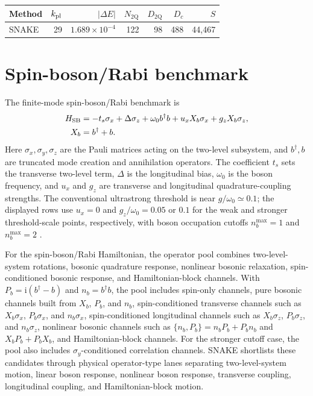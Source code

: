 \documentclass[
  reprint,
  amsmath,
  amssymb,
  aps,
  pra,
  nofootinbib,
  superscriptaddress,
  floatfix
]{revtex4-2}
\newcommand{\ii}{\mathrm{i}}
\newcommand{\twq}{\mathrm{2Q}}
\begin{document}
\begin{center}
\begin{tabular}{lrrrrrr}
\toprule
Method & \(k_{\rm pl}\) & \(|\Delta E|\) & \(N_{\twq}\) & \(D_{\twq}\) & \(D_c\) & \(S\) \\
\midrule
SNAKE & 29 & \(1.689\times10^{-4}\) & 122 & 98 & 488 & 44{,}467 \\
\bottomrule
\end{tabular}
\end{center}


\section{Spin-boson/Rabi benchmark}
\label{app:spin_boson_rabi}

The finite-mode spin-boson/Rabi benchmark is
\begin{equation*}
\begin{aligned}
H_{\rm SB}
&=-t_s\sigma_x+\Delta\sigma_z+\omega_0 b^\dagger b
+u_xX_b\sigma_x+g_zX_b\sigma_z,\\
X_b&=b^\dagger+b .
\end{aligned}
\end{equation*}
Here \(\sigma_x,\sigma_y,\sigma_z\) are the Pauli matrices acting on the
two-level subsystem, and \(b^\dagger,b\) are truncated mode creation and
annihilation operators. The coefficient \(t_s\) sets the transverse two-level
term, \(\Delta\) is the longitudinal bias, \(\omega_0\) is the boson frequency,
and \(u_x\) and \(g_z\) are transverse and longitudinal quadrature-coupling
strengths. The conventional ultrastrong threshold is near
\(g/\omega_0\simeq 0.1\); the displayed rows use \(u_x=0\) and
\(g_z/\omega_0=0.05\) or \(0.1\) for the weak and stronger threshold-scale
points, respectively, with boson occupation cutoffs \(n_b^{\max}=1\) and
\(n_b^{\max}=2\) \cite{Kockum2019Ultrastrong,FornDiaz2019Ultrastrong}.

For the spin-boson/Rabi Hamiltonian, the operator pool combines two-level-system
rotations, bosonic quadrature response, nonlinear bosonic relaxation,
spin-conditioned bosonic response, and Hamiltonian-block channels. With
\(P_b=\ii(b^\dagger-b)\) and \(n_b=b^\dagger b\), the pool includes spin-only
channels, pure bosonic channels built from \(X_b\), \(P_b\), and \(n_b\),
spin-conditioned transverse channels such as \(X_b\sigma_x\), \(P_b\sigma_x\),
and \(n_b\sigma_x\), spin-conditioned longitudinal channels such as
\(X_b\sigma_z\), \(P_b\sigma_z\), and \(n_b\sigma_z\), nonlinear bosonic
channels such as \(\{n_b,P_b\}=n_bP_b+P_bn_b\) and \(X_bP_b+P_bX_b\), and
Hamiltonian-block channels. For the stronger cutoff case, the pool also
includes \(\sigma_y\)-conditioned correlation channels. SNAKE shortlists these
candidates through physical operator-type lanes separating two-level-system
motion, linear boson response, nonlinear boson response, transverse coupling,
longitudinal coupling, and Hamiltonian-block motion.
\end{document}
